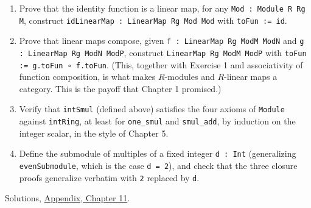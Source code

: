 \begin{enumerate}
\item
  Prove that the identity function is a linear map, for any \texttt{Mod : Module R Rg M}, construct \texttt{idLinearMap : LinearMap Rg Mod Mod} with \texttt{toFun := id}.
\item
  Prove that linear maps compose, given \texttt{f : LinearMap Rg ModM ModN} and \texttt{g : LinearMap Rg ModN ModP}, construct \texttt{LinearMap Rg ModM ModP} with \texttt{toFun := g.toFun ∘ f.toFun}. (This, together with Exercise 1 and associativity of function composition, is what makes \(R\)-modules and \(R\)-linear maps a category. This is the payoff that Chapter 1 promised.)
\item
  Verify that \texttt{intSmul} (defined above) satisfies the four axioms of \texttt{Module} against \texttt{intRing}, at least for \texttt{one\_\allowbreak{}smul} and \texttt{smul\_\allowbreak{}add}, by induction on the integer scalar, in the style of Chapter 5.
\item
  Define the submodule of multiples of a fixed integer \texttt{d : Int} (generalizing \texttt{evenSubmodule}, which is the case \texttt{d = 2}), and check that the three closure proofs generalize verbatim with \texttt{2} replaced by \texttt{d}.
\end{enumerate}

Solutions, \hyperref[sec:15-appendix-solutions:11-chapter-11:1]{Appendix, Chapter 11}.

